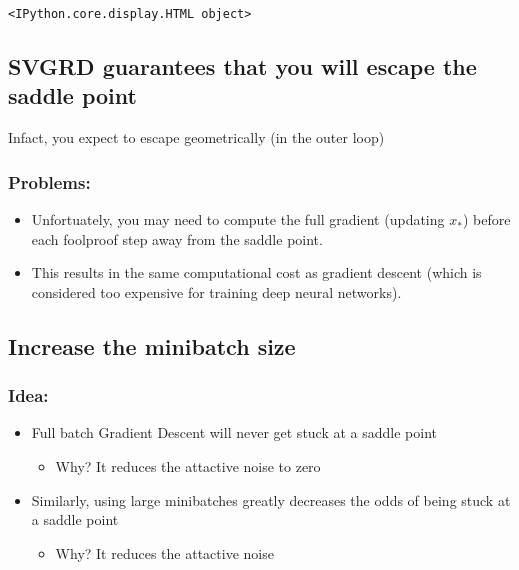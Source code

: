 \documentclass[11pt]{article}
\providecommand{\tightlist}{%
      \setlength{\itemsep}{0pt}\setlength{\parskip}{0pt}}
\begin{document}
    
    
    \begin{verbatim}
<IPython.core.display.HTML object>
    \end{verbatim}

    
    \hypertarget{svgrd-guarantees-that-you-will-escape-the-saddle-point}{%
\subsection{SVGRD guarantees that you will escape the saddle
point}\label{svgrd-guarantees-that-you-will-escape-the-saddle-point}}

Infact, you expect to escape geometrically (in the outer loop)

    \hypertarget{problems}{%
\subsubsection{Problems:}\label{problems}}

\begin{itemize}
\tightlist
\item
  Unfortuately, you may need to compute the full gradient (updating
  \(x_*\)) before each foolproof step away from the saddle point.
\item
  This results in the same computational cost as gradient descent (which
  is considered too expensive for training deep neural networks).
\end{itemize}

    \hypertarget{increase-the-minibatch-size}{%
\subsection{Increase the minibatch
size}\label{increase-the-minibatch-size}}

\hypertarget{idea}{%
\subsubsection{Idea:}\label{idea}}

\begin{itemize}
\tightlist
\item
  Full batch Gradient Descent will never get stuck at a saddle point

  \begin{itemize}
  \tightlist
  \item
    Why? It reduces the attactive noise to zero
  \end{itemize}
\item
  Similarly, using large minibatches greatly decreases the odds of being
  stuck at a saddle point

  \begin{itemize}
  \tightlist
  \item
    Why? It reduces the attactive noise
  \end{itemize}
\end{itemize}
\end{document}
